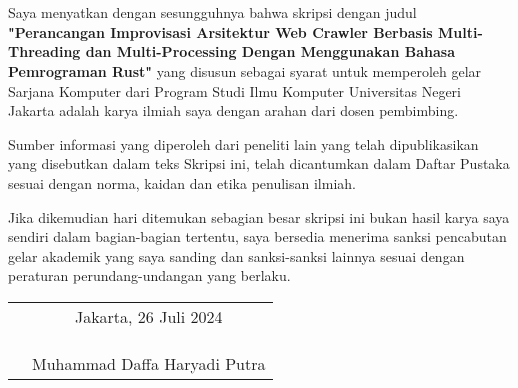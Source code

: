 \chapter*{}
\onehalfspacing{}

Saya menyatkan dengan sesungguhnya bahwa skripsi dengan judul
\textbf{"Perancangan Improvisasi Arsitektur Web Crawler Berbasis Multi-Threading dan Multi-Processing Dengan Menggunakan Bahasa Pemrograman Rust"} yang disusun sebagai syarat untuk memperoleh gelar Sarjana Komputer
dari Program Studi Ilmu Komputer Universitas Negeri Jakarta adalah karya ilmiah
saya dengan arahan dari dosen pembimbing.

Sumber informasi yang diperoleh dari peneliti lain yang telah dipublikasikan 
yang disebutkan dalam teks Skripsi ini, telah dicantumkan dalam Daftar Pustaka 
sesuai dengan norma, kaidan dan etika penulisan ilmiah.

Jika dikemudian hari ditemukan sebagian besar skripsi ini bukan hasil karya saya 
sendiri dalam bagian-bagian tertentu, saya bersedia menerima sanksi pencabutan 
gelar akademik yang saya sanding dan sanksi-sanksi lainnya sesuai dengan 
peraturan perundang-undangan yang berlaku.

\vspace{4cm}

\begin{tabular}{p{7.5cm}c}
	&Jakarta, 26 Juli 2024\\
	&\\
	&\\
	&\\
	&Muhammad Daffa Haryadi Putra
\end{tabular}
